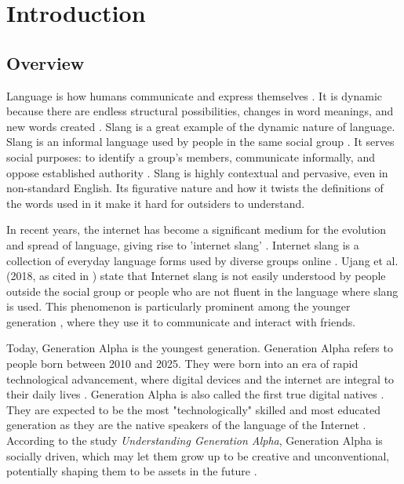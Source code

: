 \chapter{Introduction}
\label{sec:researchdesc}    %

\section{Overview}
\label{sec:overview}

Language is how humans communicate and express themselves \cite{Crystal_Robins_2024}.
It is dynamic because there are endless structural possibilities, changes in word meanings, and new words created \cite{Libretexts_2021}.
Slang is a great example of the dynamic nature of language. Slang is an informal language used by people in the same social group \cite{Fernández-Toro_2016}.
It serves social purposes: to identify a group's members, communicate informally, and oppose established authority \cite{McArthur_1998}. Slang is highly contextual and pervasive, even in non-standard English.
Its figurative nature and how it twists the definitions of the words used in it make it hard for outsiders to understand. 

In recent years, the internet has become a significant medium for the evolution and spread of language, giving rise to 'internet slang' \cite{Liu_Zhang_Li_2023}.
Internet slang is a collection of everyday language forms used by diverse groups online \cite{Barseghyan2014ONSA}.
Ujang et al. (2018, as cited in \cite{Sabri2020}) state that Internet slang is not easily understood by people outside the social group or people who are not fluent in the language where slang is used.
This phenomenon is particularly prominent among the younger generation \cite{Maulidiya_Wijaya_Mauren_Adha_Pandin_2021}, where they use it to communicate and interact with friends.

Today, Generation Alpha is the youngest generation. Generation Alpha refers to people born between 2010 and 2025.
They were born into an era of rapid technological advancement, where digital devices and the internet are integral to their daily lives \cite{McCrindle2020}.
Generation Alpha is also called the first true digital natives \cite{Jukic_Skojo2021}.
They are expected to be the most "technologically" skilled and most educated generation as they are the native speakers of the language of the Internet \cite{Prensky_2001b}.
According to the study \textit{Understanding Generation Alpha}, Generation Alpha is socially driven, which may let them grow up to be creative and unconventional, potentially shaping them to be assets in the future \cite{Jha2020}.

